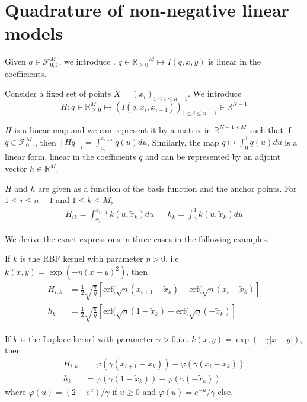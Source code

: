 \section{Quadrature of non-negative linear models}\label{app:diffytw-quadrature}

Given $q\in\mathcal F_{0,1}^M$, we introduce . $q\in{\mathbb R_{\geq 0}}^M \mapsto I(q, x, y)$ is linear in the coefficients.

Consider a fixed set of points $X=(x_i)_{1\leq i\leq n-1}$. We introduce
\begin{equation}
H: q\in\mathbb R_{\geq 0}^M \mapsto (I(q, x_i, x_{i+1}))_{1\leq i\leq n-1}\in \mathbb R^{N-1}
\end{equation}

$H$ is a linear map and we can represent it by a matrix in $\mathbb R^{N-1 \times M}$ such that if $q\in \mathcal F_{0,1}^M$, then $[Hq]_{i} = \int_{x_i}^{x_{i+1}}q(u)du$. Similarly, the map $q \mapsto \int_0^1 q(u)du$ is a linear form, linear in the coefficients $q$ and can be represented by an adjoint vector $h\in\mathbb R^M$.

$H$ and $h$ are given as a function of the basis function and the anchor points. For $1 \leq i \leq n-1$ and $1\leq k\leq M$,
\begin{align}\label{eq:H}
    H_{ik}= \int_{x_i}^{x_{i+1}}k(u, \tilde x_k)du&& h_k = \int_0^1 k(u, \tilde x_k)du
\end{align}

We derive the exact expressions in three cases in the following examples.

\begin{example}\label{ex:H-rbf} If $k$ is the RBF kernel with parameter $\eta > 0$, i.e. $k(x, y) = \exp\left( - \eta (x - y)^2\right)$, then
\begin{align}
    H_{i,k} &= \frac{1}{2}\sqrt{\frac{\pi}{\eta}}\left[\mathrm{erf}(\sqrt{\eta}(x_{i+1}-\tilde x_k) - \mathrm{erf}(\sqrt{\eta}(x_i- \tilde x_k) \right]\\
    h_k &= \frac{1}{2}\sqrt{\frac{\pi}{\eta}}\left[\mathrm{erf}(\sqrt{\eta}(1-\tilde x_k) - \mathrm{erf}(\sqrt{\eta}(- \tilde x_k) \right]
\end{align}
\end{example}
\begin{example}\label{ex:H-laplace} If $k$ is the Laplace kernel with parameter $\gamma > 0$,i.e. $k(x, y) = \exp\left( - \gamma\vert x - y\vert\right)$, then
\begin{align}
    H_{i,k} &= \varphi(\gamma(x_{i+1} - \tilde x_k)) - \varphi(\gamma(x_i - \tilde x_k))\\
    h_{k} &= \varphi(\gamma(1- \tilde x_k)) - \varphi(\gamma(- \tilde x_k))
\end{align}
where $\varphi(u) = (2 - e^u)/\gamma$ if $u \geq 0$ and $\varphi(u) = e^{-u} / \gamma$ else.
\end{example}




